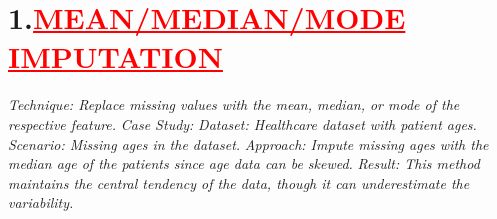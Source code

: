 \documentclass[12pt]{article}
\begin{document}
\section*{\textbf{1.\hspace{1cm}\textcolor{red}{\underline{\large{MEAN/MEDIAN/MODE IMPUTATION}}}}}
\hspace{1cm}\large{\emph{Technique: Replace missing values with the mean, median, or mode of the respective feature.}}\vspace{1cm}\newline
\hspace{1cm}\large{\emph{Case Study:}}\vspace{0.25cm}\newline
\hspace{1 cm}\large{\emph{Dataset: Healthcare dataset with patient ages.}}\vspace{0.25cm}\newline
\hspace{1 cm}\large{\emph{Scenario: Missing ages in the dataset.}}\vspace{0.25cm}\newline
\hspace{1 cm}\large{\emph{Approach: Impute missing ages with the median age of the patients since age data can be skewed.}}\vspace{0.25cm}\newline
\hspace{1 cm}\large{\emph{Result: This method maintains the central tendency of the data, though it can underestimate the variability.}}\vspace{1cm}\newline
\end{document}

